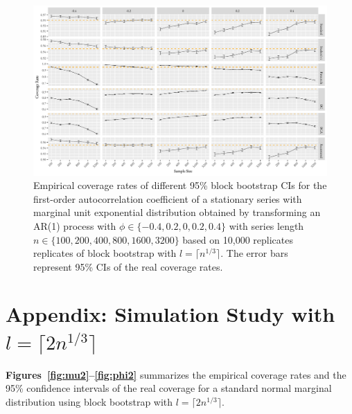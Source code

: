 \documentclass[12pt]{article}
\begin{document}
\begin{figure}[tbp]
  \centering
  \includegraphics[width=\textwidth]{figures/plot_exp_phi_1}
  \caption{Empirical coverage rates of different 95\% block bootstrap CIs for 
    the first-order autocorrelation coefficient of a stationary series
    with marginal unit exponential distribution obtained by transforming an AR(1) 
    process with 
    $\phi \in \{-0.4, 0.2, 0, 0.2, 0.4\}$ with series length
    $n \in \{100, 200, 400, 800, 1600, 3200\}$ based on 10,000 replicates 
    replicates of
    block bootstrap with $l = \lceil n^{1/3} \rceil$. 
    The error bars represent 95\% CIs of the real coverage rates.}
  \label{fig:exp_phi1}
\end{figure}


\section*{Appendix: Simulation Study with $l = \lceil 2n^{1/3} \rceil$}

\textbf{Figures~\ref{fig:mu2}--\ref{fig:phi2}} 
summarizes the empirical coverage rates and the 95\% confidence intervals of the 
real coverage for a standard normal marginal distribution using block bootstrap
with $l = \lceil 2n^{1/3} \rceil$.
\end{document}
